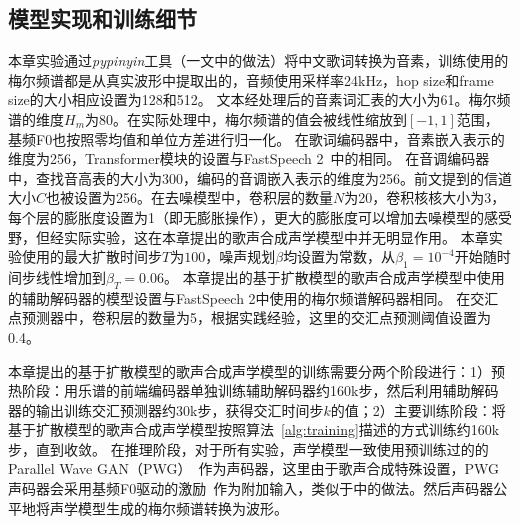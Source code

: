 \subsection{模型实现和训练细节}
\label{sec:svs_inference}
本章实验通过\textit{pypinyin}工具（\citet{ren2020deepsinger}一文中的做法）将中文歌词转换为音素，训练使用的梅尔频谱都是从真实波形中提取出的，音频使用采样率24kHz，hop size和frame size的大小相应设置为128和512。
文本经处理后的音素词汇表的大小为61。梅尔频谱的维度$H_m$为80。在实际处理中，梅尔频谱的值会被线性缩放到$[-1,1]$范围，基频F0也按照零均值和单位方差进行归一化。
在歌词编码器中，音素嵌入表示的维度为256，Transformer模块的设置与FastSpeech 2~\citep{ren2021fastspeech}中的相同。
在音调编码器中，查找音高表的大小为300，编码的音调嵌入表示的维度为256。前文提到的信道大小$C$也被设置为256。在去噪模型中，卷积层的数量$N$为20，卷积核核大小为3，每个层的膨胀度设置为1（即无膨胀操作），更大的膨胀度可以增加去噪模型的感受野，但经实际实验，这在本章提出的歌声合成声学模型中并无明显作用。
本章实验使用的最大扩散时间步$T$为$100$，噪声规划$\beta$均设置为常数，从$\beta_1=10^{-4}$开始随时间步线性增加到$\beta_T=0.06$。
本章提出的基于扩散模型的歌声合成声学模型中使用的辅助解码器的模型设置与FastSpeech 2中使用的梅尔频谱解码器相同。
在交汇点预测器中，卷积层的数量为5，根据实践经验，这里的交汇点预测阈值设置为0.4。


本章提出的基于扩散模型的歌声合成声学模型的训练需要分两个阶段进行：1）预热阶段：用乐谱的前端编码器单独训练辅助解码器约160k步，然后利用辅助解码器的输出训练交汇预测器约30k步，获得交汇时间步$k$的值；2）主要训练阶段：将基于扩散模型的歌声合成声学模型按照算法~\ref{alg:training}描述的方式训练约160k步，直到收敛。
在推理阶段，对于所有实验，声学模型一致使用预训练过的的Parallel Wave GAN（PWG）~\citep{yamamoto2020parallel}作为声码器，这里由于歌声合成特殊设置，PWG声码器会采用基频F0驱动的激励~\citep{wang2020using}作为附加输入，类似于\citet{chen2020hifisinger}中的做法。然后声码器公平地将声学模型生成的梅尔频谱转换为波形。
